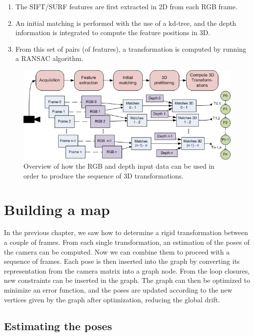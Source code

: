 \begin{enumerate}
\item The \gls{SIFT}/\gls{SURF} features are first extracted in 2D from each RGB frame.
\item An initial matching is performed with the use of a kd-tree, and the depth information is integrated to compute the feature positions in 3D.
\item From this set of pairs (of features), a transformation is computed by running a \gls{RANSAC} algorithm.
\end{enumerate}

\begin{figure}[H]
\centering
\includegraphics[width=1.0\textwidth]{figures/overview_rgb_depth}
\caption{Overview of how the RGB and depth input data can be used in order to produce the sequence of 3D transformations.}
\end{figure}

\chapter{Building a map}
\label{chap:map}

In the previous chapter, we saw how to determine a rigid transformation between a couple of frames. From each single transformation, an estimation of the poses of the camera can be computed. Now we can combine them to proceed with a sequence of frames. Each pose is then inserted into the graph by converting its representation from the camera matrix into a graph node. From the loop closures, new constraints can be inserted in the graph. The graph can then be optimized to minimize an error function, and the poses are updated according to the new vertices given by the graph after optimization, reducing the global drift.

\section{Estimating the poses}

